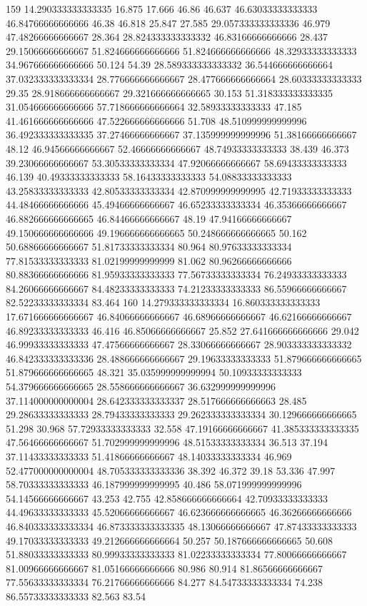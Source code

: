 159 14.290333333333335 16.875 17.666 46.86 46.637 46.63033333333333 46.84766666666666 46.38 46.818 25.847 27.585 29.057333333333336 46.979 47.48266666666667 28.364 28.824333333333332 46.83166666666666 28.437 29.15066666666667 51.824666666666666 51.824666666666666 48.32933333333333 34.967666666666666 50.124 54.39 28.589333333333332 36.544666666666664 37.032333333333334 28.776666666666667 28.477666666666664 28.60333333333333 29.35 28.918666666666667 29.321666666666665 30.153 51.318333333333335 31.054666666666666 57.718666666666664 32.58933333333333 47.185 41.461666666666666 47.522666666666666 51.708 48.510999999999996 36.492333333333335 37.27466666666667 37.135999999999996 51.38166666666667 48.12 46.94566666666667 52.46666666666667 48.74933333333333 38.439 46.373 39.23066666666667 53.30533333333334 47.92066666666667 58.69433333333333 46.139 40.49333333333333 58.16433333333333 54.08833333333333 43.25833333333333 42.80533333333334 42.870999999999995 42.71933333333333 44.48466666666666 45.49466666666667 46.65233333333334 46.35366666666667 46.882666666666665 46.84466666666667 48.19 47.94166666666667 49.150666666666666 49.196666666666665 50.248666666666665 50.162 50.68866666666667 51.81733333333334 80.964 80.97633333333334 77.81533333333333 81.02199999999999 81.062 80.96266666666666 80.88366666666666 81.95933333333333 77.56733333333334 76.24933333333333 84.26066666666667 84.48233333333333 74.21233333333333 86.55966666666667 82.52233333333334 83.464
160 14.279333333333334 16.860333333333333 17.671666666666667 46.84066666666667 46.68966666666667 46.62166666666667 46.89233333333333 46.416 46.85066666666667 25.852 27.641666666666666 29.042 46.99933333333333 47.47566666666667 28.33066666666667 28.903333333333332 46.842333333333336 28.488666666666667 29.19633333333333 51.879666666666665 51.879666666666665 48.321 35.035999999999994 50.10933333333333 54.379666666666665 28.558666666666667 36.632999999999996 37.114000000000004 28.642333333333337 28.517666666666663 28.485 29.28633333333333 28.79433333333333 29.262333333333334 30.129666666666665 51.298 30.968 57.72933333333333 32.558 47.19166666666667 41.385333333333335 47.56466666666667 51.702999999999996 48.51533333333334 36.513 37.194 37.11433333333333 51.41866666666667 48.14033333333334 46.969 52.477000000000004 48.705333333333336 38.392 46.372 39.18 53.336 47.997 58.70333333333333 46.187999999999995 40.486 58.071999999999996 54.14566666666667 43.253 42.755 42.858666666666664 42.70933333333333 44.49633333333333 45.52066666666667 46.623666666666665 46.36266666666666 46.840333333333334 46.873333333333335 48.13066666666667 47.87433333333333 49.17033333333333 49.212666666666664 50.257 50.187666666666665 50.608 51.88033333333333 80.99933333333333 81.02233333333334 77.80066666666667 81.00966666666667 81.05166666666666 80.986 80.914 81.86566666666667 77.55633333333334 76.21766666666666 84.277 84.54733333333334 74.238 86.55733333333333 82.563 83.54
